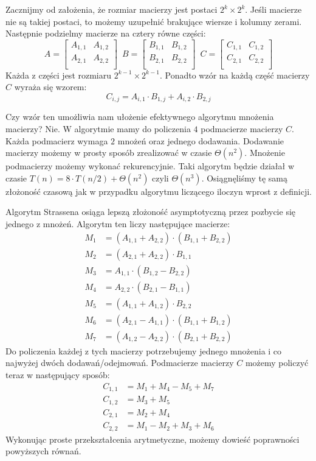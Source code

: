 Zacznijmy od założenia, że rozmiar macierzy jest postaci $2^k \times 2^k$.
Jeśli macierze nie są takiej postaci, to możemy uzupełnić brakujące wiersze i kolumny zerami.
Następnie podzielmy macierze na cztery równe części:
\[
  A = 
  \begin{bmatrix}
    A_{1,1} & A_{1,2} \\
    A_{2,1} & A_{2,2} \\
  \end{bmatrix} \enspace  
  B = 
  \begin{bmatrix}
    B_{1,1} & B_{1,2} \\
    B_{2,1} & B_{2,2} \\
  \end{bmatrix} \enspace
  C = 
  \begin{bmatrix}
    C_{1,1} & C_{1,2} \\
    C_{2,1} & C_{2,2} \\
  \end{bmatrix}
\]
Każda z części jest rozmiaru $2^{k-1} \times 2^{k-1}$.
Ponadto wzór na każdą część macierzy $C$ wyraża się wzorem:
\[
 C_{i,j} = A_{i,1} \cdot B_{1,j} + A_{i,2} \cdot B_{2,j}
\]

Czy wzór ten umożliwia nam ułożenie efektywnego algorytmu mnożenia macierzy?
Nie.
W algorytmie mamy do policzenia $4$ podmacierze macierzy $C$.
Każda podmacierz wymaga $2$ mnożeń oraz jednego dodawania.
Dodawanie macierzy możemy w prosty sposób zrealizować w czasie $\Theta(n^2)$.
Mnożenie podmacierzy możemy wykonać rekurencyjnie.
Taki algorytm będzie działał w czasie $T(n) = 8\cdot T(n/2) + \Theta(n^2)$ czyli $\Theta(n^3)$.
Osiągnęliśmy tę samą złożoność czasową jak w przypadku algorytmu liczącego iloczyn wprost z definicji.

Algorytm Strassena osiąga lepszą złożoność asymptotyczną przez pozbycie się jednego z mnożeń.
Algorytm ten liczy następujące macierze:
\begin{align*}
 M_1 &= (A_{1,1} + A_{2,2}) \cdot (B_{1,1} + B_{2,2}) \\
 M_2 &= (A_{2,1} + A_{2,2}) \cdot B_{1,1} \\
 M_3 &= A_{1,1} \cdot (B_{1,2} - B_{2,2}) \\
 M_4 &= A_{2,2} \cdot (B_{2,1} - B_{1,1}) \\
 M_5 &= (A_{1,1} + A_{1,2}) \cdot B_{2,2} \\
 M_6 &= (A_{2,1} - A_{1,1}) \cdot (B_{1,1} + B_{1,2}) \\
 M_7 &= (A_{1,2} - A_{2,2}) \cdot (B_{2,1} + B_{2,2})
\end{align*}
Do policzenia każdej z tych macierzy potrzebujemy jednego mnożenia i co najwyżej dwóch dodawań/odejmowań.
Podmacierze macierzy $C$ możemy policzyć teraz w następujący sposób:
\begin{align*}
 C_{1,1} &= M_1 + M_4 - M_5 + M_7 \\
 C_{1,2} &= M_3 + M_5 \\
 C_{2,1} &= M_2 + M_4 \\
 C_{2,2} &= M_1 - M_2 + M_3 + M_6
\end{align*}
Wykonując proste przekształcenia arytmetyczne, możemy dowieść poprawności powyższych równań.

